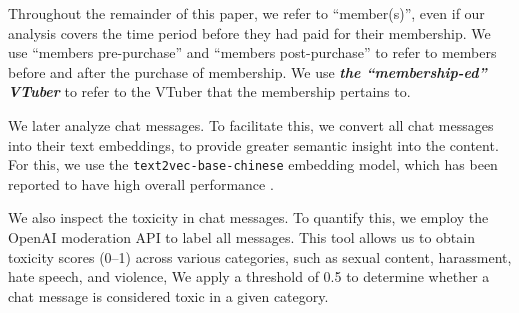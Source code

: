 Throughout the remainder of this paper, we refer to ``member(s)'', even if our analysis covers the time period before they had paid for their membership. We use ``members pre-purchase'' and ``members post-purchase'' to refer to members before and after the purchase of membership. We use \textbf{\emph{the ``membership-ed'' VTuber}} to refer to the VTuber that the membership pertains to.





\label{subsec:nlp_methods}
We later analyze chat messages. To facilitate this, we convert all chat messages into their text embeddings, to provide greater semantic insight into the content. 
For this, we use the \texttt{text2vec-base-chinese} embedding model, which has been reported to have high overall performance \cite{Text2vec, embeddingTest}.

We also inspect the toxicity in chat messages. To quantify this, we employ the OpenAI moderation API to label all messages. This tool allows us to obtain toxicity scores (0--1) across various categories, such as sexual content, harassment, hate speech, and violence, \etc We apply a threshold of 0.5 to determine whether a chat message is considered toxic in a given category.




